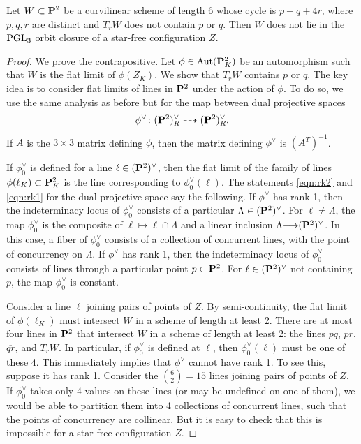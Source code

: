 \documentclass[12pt,reqno]{amsart}
\renewcommand{\to}{{\longrightarrow}}
\numberwithin{equation}{section}
\begin{document}
\begin{proposition}\label{prop:pq4r}
  Let $W \subset \P^2$ be a curvilinear scheme of length 6 whose cycle is $p + q + 4r$, where $p,q,r$ are distinct and $T_rW$ does not contain $p$ or $q$.
  Then $W$ does not lie in the $\PGL_3$ orbit closure of a star-free configuration $Z$.
\end{proposition}
\begin{proof}
  We prove the contrapositive.
  Let $\phi \in \Aut(\P^2_K)$ be an automorphism such that $W$ is the flat limit of $\phi(Z_K)$.
  We show that $T_r W$ contains $p$ or $q$.
  The key idea is to consider flat limits of lines in $\P^2$ under the action of $\phi$.
  To do so, we use the same analysis as before but for the map between dual projective spaces
  \[\phi^\vee \colon (\P^2)_R^\vee \dashrightarrow (\P^2)_R^\vee.\]
  If $A$ is the $3 \times 3$ matrix defining $\phi$, then the matrix defining $\phi^\vee$ is $(A^T)^{-1}$.

  If $\phi_0^\vee$ is defined for a line $\ell \in (\P^2)^\vee$, then the flat limit of the family of lines $\phi(\ell_K) \subset \P^2_K$ is the line corresponding to $\phi_0^\vee(\ell)$.
  The statements \eqref{eqn:rk2} and \eqref{eqn:rk1} for the dual projective space say the following.
  If $\phi^\vee$ has rank 1, then the indeterminacy locus of $\phi^\vee_0$ consists of a particular $\Lambda \in (\P^2)^\vee$.
  For $\ell \neq \Lambda$, the map $\phi_0^\vee$ is the composite of $\ell \mapsto \ell \cap \Lambda$ and a linear inclusion $\Lambda \to (\P^2)^\vee$.
  In this case, a fiber of $\phi_0^\vee$ consists of a collection of concurrent lines, with the point of concurrency on $\Lambda$.
  If $\phi^\vee$ has rank 1, then the indeterminacy locus of $\phi^\vee_0$ consists of lines through a particular point $p \in \P^2$.
  For $\ell \in (\P^2)^\vee$ not containing $p$, the map $\phi_0^\vee$ is constant.

  Consider a line $\ell$ joining pairs of points of $Z$.
  By semi-continuity, the flat limit of $\phi(\ell_K)$ must intersect $W$ in a scheme of length at least 2.
  There are at most four lines in $\P^2$ that intersect $W$ in a scheme of length at least 2: the lines $\overline{pq}$, $\overline{pr}$, $\overline{qr}$, and $T_rW$.
  In particular, if $\phi_0^\vee$ is defined at $\ell$, then $\phi_0^\vee(\ell)$ must be one of these 4.
  This immediately implies that $\phi^\vee$ cannot have rank 1.
  To see this, suppose it has rank 1.
  Consider the ${6 \choose  2} = 15$ lines joining pairs of points of $Z$.
  If $\phi_0^\vee$ takes only 4 values on these lines (or may be undefined on one of them), we would be able to partition them into 4 collections of concurrent lines, such that the points of concurrency are collinear.
  But it is easy to check that this is impossible for a star-free configuration $Z$.


\end{proof}
\end{document}
